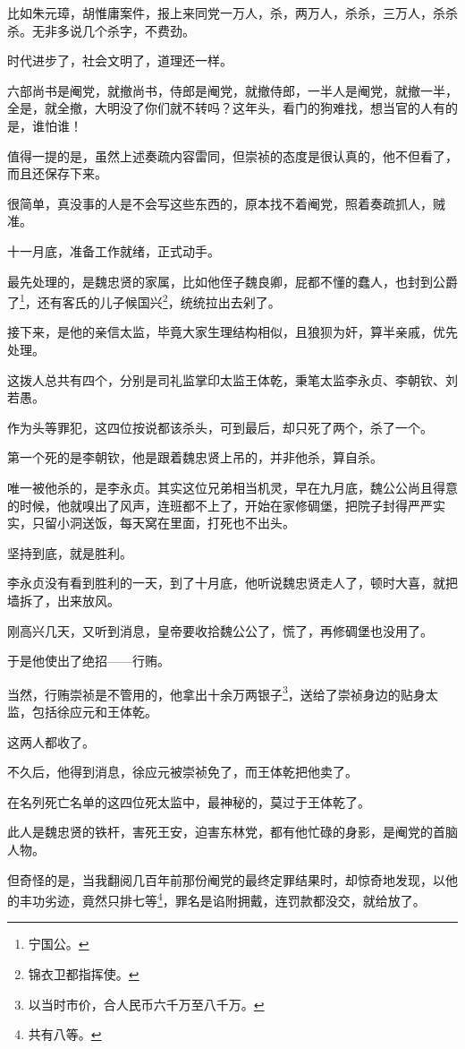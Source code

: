 \begin{multicols}{\theparacolNo}
		比如朱元璋，胡惟庸案件，报上来同党一万人，杀，两万人，杀杀，三万人，杀杀杀。无非多说几个杀字，不费劲。

		时代进步了，社会文明了，道理还一样。

		六部尚书是阉党，就撤尚书，侍郎是阉党，就撤侍郎，一半人是阉党，就撤一半，全是，就全撤，大明没了你们就不转吗？这年头，看门的狗难找，想当官的人有的是，谁怕谁！

		值得一提的是，虽然上述奏疏内容雷同，但崇祯的态度是很认真的，他不但看了，而且还保存下来。

		很简单，真没事的人是不会写这些东西的，原本找不着阉党，照着奏疏抓人，贼准。

		十一月底，准备工作就绪，正式动手。

		最先处理的，是魏忠贤的家属，比如他侄子魏良卿，屁都不懂的蠢人，也封到公爵了\footnote{宁国公。}，还有客氏的儿子候国兴\footnote{锦衣卫都指挥使。}，统统拉出去剁了。

		接下来，是他的亲信太监，毕竟大家生理结构相似，且狼狈为奸，算半亲戚，优先处理。

		这拨人总共有四个，分别是司礼监掌印太监王体乾，秉笔太监李永贞、李朝钦、刘若愚。

		作为头等罪犯，这四位按说都该杀头，可到最后，却只死了两个，杀了一个。

		第一个死的是李朝钦，他是跟着魏忠贤上吊的，并非他杀，算自杀。

		唯一被他杀的，是李永贞。其实这位兄弟相当机灵，早在九月底，魏公公尚且得意的时候，他就嗅出了风声，连班都不上了，开始在家修碉堡，把院子封得严严实实，只留小洞送饭，每天窝在里面，打死也不出头。

		坚持到底，就是胜利。

		李永贞没有看到胜利的一天，到了十月底，他听说魏忠贤走人了，顿时大喜，就把墙拆了，出来放风。

		刚高兴几天，又听到消息，皇帝要收拾魏公公了，慌了，再修碉堡也没用了。

		于是他使出了绝招——行贿。

		当然，行贿崇祯是不管用的，他拿出十余万两银子\footnote{以当时市价，合人民币六千万至八千万。}，送给了崇祯身边的贴身太监，包括徐应元和王体乾。

		这两人都收了。

		不久后，他得到消息，徐应元被崇祯免了，而王体乾把他卖了。

		在名列死亡名单的这四位死太监中，最神秘的，莫过于王体乾了。

		此人是魏忠贤的铁杆，害死王安，迫害东林党，都有他忙碌的身影，是阉党的首脑人物。

		但奇怪的是，当我翻阅几百年前那份阉党的最终定罪结果时，却惊奇地发现，以他的丰功劣迹，竟然只排七等\footnote{共有八等。}，罪名是谄附拥戴，连罚款都没交，就给放了。


\end{multicols}
